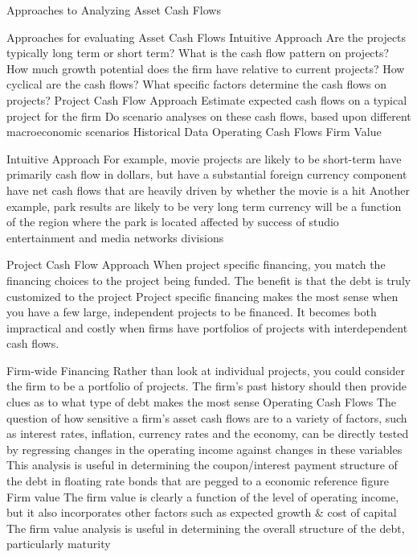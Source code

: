 \documentclass[10pt]{article}
\begin{document}
    \begin{core}{Approaches to Analyzing Asset Cash Flows}

      Approaches for evaluating Asset Cash Flows
      Intuitive Approach
      Are the projects typically long term or short term? What is the cash flow pattern on projects?
      How much growth potential does the firm have relative to current projects?
      How cyclical are the cash flows? What specific factors determine the cash flows on projects?
      Project Cash Flow Approach
      Estimate expected cash flows on a typical project for the firm
      Do scenario analyses on these cash flows, based upon different macroeconomic scenarios
      Historical Data
      Operating Cash Flows
      Firm Value

      Intuitive Approach
      For example, movie projects are likely to
      be short-term
      have primarily cash flow in dollars, but have a substantial foreign currency component
      have net cash flows that are heavily driven by whether the movie is a hit
      Another example, park results are likely to be
      very long term
      currency will be a function of the region where the park is located
      affected by success of studio entertainment and media networks divisions

      Project Cash Flow Approach
      When project specific financing, you match the financing choices to the project being funded. The benefit is that the debt is truly customized to the project
      Project specific financing makes the most sense when you have a few large, independent projects to be financed. It becomes both impractical and costly when firms have portfolios of projects with interdependent cash flows.

      Firm-wide Financing
      Rather than look at individual projects, you could consider the firm to be a portfolio of projects. The firm’s past history should then provide clues as to what type of debt makes the most sense
      Operating Cash Flows
      The question of how sensitive a firm’s asset cash flows are to a variety of factors, such as interest rates, inflation, currency rates and the economy, can be directly tested by regressing changes in the operating income against changes in these variables
      This analysis is useful in determining the coupon/interest payment structure of the debt in floating rate bonds that are pegged to a economic reference figure
      Firm value
      The firm value is clearly a function of the level of operating income, but it also incorporates other factors such as expected growth & cost of capital
      The firm value analysis is useful in determining the overall structure of the debt, particularly maturity

    \end{core}
\end{document}
